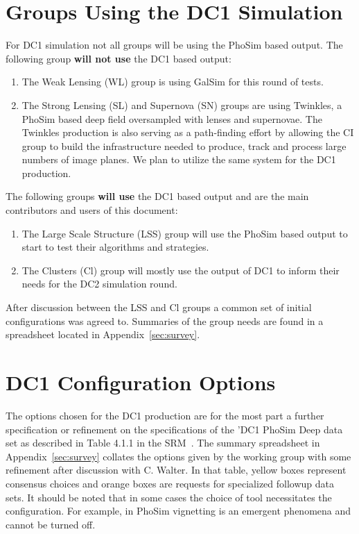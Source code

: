 \documentclass[12pt,letterpaper]{article}
\begin{document}
\section{Groups Using the DC1 Simulation}

For DC1 simulation not all groups will be using the PhoSim based
output.  The following group {\bf will not use} the DC1 based
output:

\begin{enumerate}
\item The Weak Lensing (WL) group is using GalSim for this round
  of tests. 
\item The Strong Lensing (SL) and Supernova (SN) groups are using
  Twinkles\cite{Twinkles:2016}, a PhoSim based deep field oversampled
  with lenses and supernovae.  The Twinkles production is also serving
  as a path-finding effort by allowing the CI group to build the
  infrastructure needed to produce, track and process large numbers of
  image planes.  We plan to utilize the same system for the DC1
  production.
\end{enumerate}

The following groups {\bf will use} the DC1 based output and are the
main contributors and users of this document:

\begin{enumerate}
\item The Large Scale Structure (LSS) group will use the PhoSim based
  output to start to test their algorithms and strategies.
\item The Clusters (Cl) group will mostly use the output of DC1 to
  inform their needs for the DC2 simulation round.
\end{enumerate}

After discussion between the LSS and Cl groups a common set of initial
configurations was agreed to. Summaries of the group needs are found
in a spreadsheet located in Appendix~\ref{sec:survey}.

\section{DC1 Configuration Options}

The options chosen for the DC1 production are for the most part a
further specification or refinement on the specifications of the 'DC1
PhoSim Deep data set as described in Table 4.1.1 in the
SRM~\cite{SRM:2015}. The summary spreadsheet in
Appendix~\ref{sec:survey} collates the options given by the working
group with some refinement after discussion with C. Walter.  In that
table, yellow boxes represent consensus choices and orange boxes are
requests for specialized followup  data sets. It should be noted that
in some cases the choice of tool necessitates the configuration.  For
example, in PhoSim vignetting is an emergent phenomena and cannot be
turned off.
\end{document}
